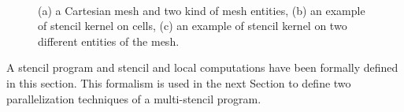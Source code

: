 \begin{figure}
\begin{center}
\\
\hspace{10pt}
\vspace{20pt}
\end{center}
\caption{(a) a Cartesian mesh and two kind of mesh entities, (b) an example of stencil kernel on cells, (c) an example of stencil kernel on two different entities of the mesh.}
\label{fig:gspmsp}
\end{figure}

A stencil program and stencil and local computations have been formally defined in this section. This formalism is used in the next Section to define two parallelization techniques of a multi-stencil program.


